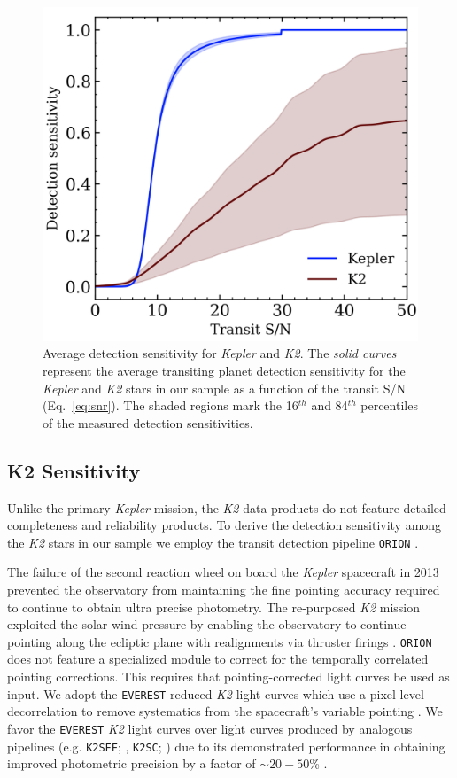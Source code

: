 \documentclass[twocolumn]{emulateapj}
\newcommand{\kepler}[1]{\emph{Kepler}#1}
\newcommand{\ktwo}[1]{\emph{K2}#1}
\begin{document}
\begin{figure}
  \centering
  \includegraphics[width=0.98\hsize]{figures/senscurves.png}
  \caption{Average detection sensitivity for \kepler{} and \ktwo{.} The \emph{solid curves} represent the
    average transiting planet detection sensitivity for the \kepler{} and \ktwo{} stars in our sample as
    a function of the transit S/N (Eq.~\ref{eq:snr}). The shaded regions mark the 16$^{th}$ and 84$^{th}$
    percentiles of the measured detection sensitivities.} 
  \label{fig:senscurves}
\end{figure}


\subsection{K2 Sensitivity}
Unlike the primary \kepler{} mission, the \ktwo{} data products do not feature detailed completeness and reliability
products. To derive the detection sensitivity among the \ktwo{} stars in our sample we employ the transit detection
pipeline \texttt{ORION} \citep{cloutier19b}.

The failure of the second reaction wheel on board the \kepler{} spacecraft in 2013 prevented the observatory from
maintaining the fine pointing accuracy required to continue to obtain ultra precise photometry. The re-purposed \ktwo{}
mission exploited the solar wind pressure by enabling the observatory to continue pointing along the ecliptic
plane with realignments via thruster firings \citep{howell14}.
\texttt{ORION} does not feature a specialized module to correct for the temporally correlated pointing corrections.
This requires that pointing-corrected light curves be used as input. We adopt
the \texttt{EVEREST}-reduced \ktwo{} light curves which use a pixel level decorrelation to remove systematics from
the spacecraft's variable pointing \citep{luger16,luger18}. We favor the \texttt{EVEREST} \ktwo{} light curves over
light curves produced by analogous pipelines (e.g. \texttt{K2SFF}; \citealt{vanderburg14}, \texttt{K2SC};
\citealt{aigrain15,aigrain16}) due to its demonstrated performance
in obtaining improved photometric precision by a factor of $\sim 20-50$\% \citep{luger16}.
\end{document}
